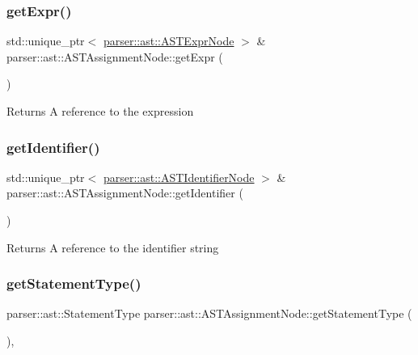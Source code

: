 \subsubsection{\texorpdfstring{get\+Expr()}{getExpr()}}
{\footnotesize\ttfamily std\+::unique\+\_\+ptr$<$ \hyperlink{classparser_1_1ast_1_1ASTExprNode}{parser\+::ast\+::\+A\+S\+T\+Expr\+Node} $>$ \& parser\+::ast\+::\+A\+S\+T\+Assignment\+Node\+::get\+Expr (\begin{DoxyParamCaption}{ }\end{DoxyParamCaption})}

\begin{DoxyReturn}{Returns}
A reference to the expression 
\end{DoxyReturn}
\mbox{\label{classparser_1_1ast_1_1ASTAssignmentNode_aaff40f77ab7db5be4b4c4f354f2e8d7a}} 
\subsubsection{\texorpdfstring{get\+Identifier()}{getIdentifier()}}
{\footnotesize\ttfamily std\+::unique\+\_\+ptr$<$ \hyperlink{classparser_1_1ast_1_1ASTIdentifierNode}{parser\+::ast\+::\+A\+S\+T\+Identifier\+Node} $>$ \& parser\+::ast\+::\+A\+S\+T\+Assignment\+Node\+::get\+Identifier (\begin{DoxyParamCaption}{ }\end{DoxyParamCaption})}

\begin{DoxyReturn}{Returns}
A reference to the identifier string 
\end{DoxyReturn}
\mbox{\label{classparser_1_1ast_1_1ASTAssignmentNode_ad53e33c7aa72d26b67e38699bdac2e32}} 
\subsubsection{\texorpdfstring{get\+Statement\+Type()}{getStatementType()}}
{\footnotesize\ttfamily parser\+::ast\+::\+Statement\+Type parser\+::ast\+::\+A\+S\+T\+Assignment\+Node\+::get\+Statement\+Type (\begin{DoxyParamCaption}{ }\end{DoxyParamCaption})\hspace{0.3cm}{\ttfamily [override]}, {\ttfamily [virtual]}}

